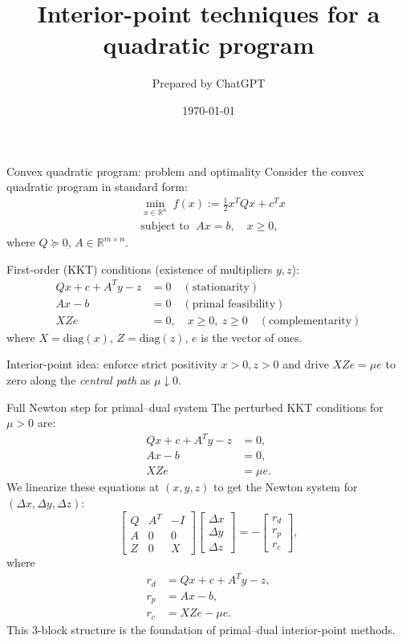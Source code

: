 \documentclass{beamer}
\title{Interior-point techniques for a quadratic program}
\author{Prepared by ChatGPT}
\date{\today}
\begin{document}
\begin{frame}
  \titlepage
\end{frame}

\begin{frame}{Convex quadratic program: problem and optimality}
\vspace{-2mm}
Consider the convex quadratic program in standard form:
\begin{align*}
  &\min_{x\in\mathbb{R}^n} \; f(x) := \tfrac{1}{2}x^T Q x + c^T x\\
  &\text{subject to }\; A x = b, \quad x \ge 0,
\end{align*}
where $Q\succeq 0$, $A\in\mathbb{R}^{m\times n}$.

First-order (KKT) conditions (existence of multipliers $y,z$):
\begin{align*}
  Qx + c + A^T y - z &= 0 \quad (\text{stationarity})\\
  Ax - b &= 0 \quad (\text{primal feasibility})\\
  X Z e &= 0,\quad x\ge0,\ z\ge0 \quad(\text{complementarity})
\end{align*}
where $X=\mathrm{diag}(x)$, $Z=\mathrm{diag}(z)$, $e$ is the vector of ones.

\vspace{2mm}
Interior-point idea: enforce strict positivity $x>0, z>0$ and drive $XZe=\mu e$ to zero along the \emph{central path} as $\mu\downarrow0$.
\end{frame}

\begin{frame}{Full Newton step for primal--dual system}
The perturbed KKT conditions for $\mu>0$ are:
\begin{align*}
  Qx + c + A^T y - z &= 0, \\
  Ax - b &= 0, \\
  XZe &= \mu e.
\end{align*}
We linearize these equations at $(x,y,z)$ to get the Newton system for $(\Delta x, \Delta y, \Delta z)$:
\[
  \begin{bmatrix}
    Q & A^T & -I \\
    A & 0   & 0   \\
    Z & 0   & X
  \end{bmatrix}
  \begin{bmatrix}
    \Delta x \\
    \Delta y \\
    \Delta z
  \end{bmatrix}
  = -\begin{bmatrix}
    r_d \\
    r_p \\
    r_c
  \end{bmatrix},
\]
where
\begin{align*}
  r_d &= Qx + c + A^T y - z,\\
  r_p &= Ax - b,\\
  r_c &= XZe - \mu e.
\end{align*}
This 3-block structure is the foundation of primal--dual interior-point methods.
\end{frame}
\end{document}

